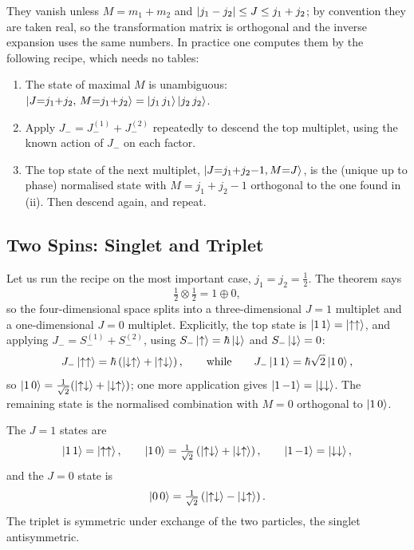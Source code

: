 \documentclass[a4paper]{scrartcl}
\begin{document}
They vanish unless $M = m_1+m_2$ and $\lvert j_1-j_2\rvert\leq J \leq j_1+j_2$; by convention they are taken real, so the transformation matrix is orthogonal and the inverse expansion uses the same numbers. In practice one computes them by the following recipe, which needs no tables:
\begin{enumerate}[label=(\roman*)]
    \item The state of maximal $M$ is unambiguous: $\ket{J{=}j_1{+}j_2,\,M{=}j_1{+}j_2} = \ket{j_1\,j_1}\ket{j_2\,j_2}$.
    \item Apply $J_- = J_-^{(1)} + J_-^{(2)}$ repeatedly to descend the top multiplet, using the known action of $J_-$ on each factor.
    \item The top state of the next multiplet, $\ket{J{=}j_1{+}j_2{-}1, M{=}J}$, is the (unique up to phase) normalised state with $M = j_1+j_2-1$ orthogonal to the one found in (ii). Then descend again, and repeat.
\end{enumerate}

\subsection{Two Spins: Singlet and Triplet}

Let us run the recipe on the most important case, $j_1 = j_2 = \frac12$. The theorem says
$$
\tfrac12 \otimes \tfrac12 = 1 \oplus 0,
$$
so the four-dimensional space splits into a three-dimensional $J=1$ multiplet and a one-dimensional $J=0$ multiplet. Explicitly, the top state is $\ket{1\,1} = \ket{\uparrow\uparrow}$, and applying $J_- = S_-^{(1)}+S_-^{(2)}$, using $S_-\ket\uparrow = \hbar\ket\downarrow$ and $S_-\ket\downarrow = 0$:
$$
J_-\ket{\uparrow\uparrow} = \hbar\left( \ket{\downarrow\uparrow} + \ket{\uparrow\downarrow} \right), \qquad \text{while} \qquad J_-\ket{1\,1} = \hbar\sqrt{2}\ket{1\,0},
$$
so $\ket{1\,0} = \frac{1}{\sqrt2}(\ket{\uparrow\downarrow}+\ket{\downarrow\uparrow})$; one more application gives $\ket{1\,{-1}} = \ket{\downarrow\downarrow}$. The remaining state is the normalised combination with $M = 0$ orthogonal to $\ket{1\,0}$.

\begin{proposition}
    The $J=1$  states are
    $$
    \ket{1\,1} = \ket{\uparrow\uparrow}, \qquad \ket{1\,0} = \tfrac{1}{\sqrt2}\left( \ket{\uparrow\downarrow}+\ket{\downarrow\uparrow} \right), \qquad \ket{1\,{-1}} = \ket{\downarrow\downarrow},
    $$
    and the $J = 0$  state is
    $$
    \ket{0\,0} = \tfrac{1}{\sqrt2}\left( \ket{\uparrow\downarrow}-\ket{\downarrow\uparrow} \right).
    $$
    The triplet is symmetric under exchange of the two particles, the singlet antisymmetric.
\end{proposition}
\end{document}
